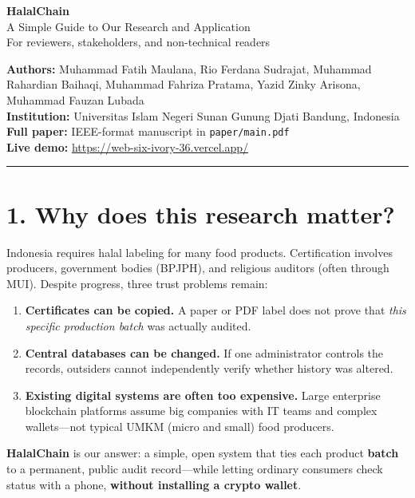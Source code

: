 \documentclass[11pt,a4paper]{article}
\newcommand{\sectionline}{\vspace{0.3em}\noindent\rule{\textwidth}{0.6pt}\vspace{0.6em}}
\begin{document}
\begin{center}
  {\LARGE\bfseries\color{halalgreen} HalalChain}\\[0.4em]
  {\large A Simple Guide to Our Research and Application}\\[0.8em]
  {\normalsize For reviewers, stakeholders, and non-technical readers}\\[1.2em]
\end{center}

\noindent
\textbf{Authors:} Muhammad Fatih Maulana, Rio Ferdana Sudrajat, Muhammad Rahardian Baihaqi, Muhammad Fahriza Pratama, Yazid Zinky Arisona, Muhammad Fauzan Lubada\\
\textbf{Institution:} Universitas Islam Negeri Sunan Gunung Djati Bandung, Indonesia\\
\textbf{Full paper:} IEEE-format manuscript in \texttt{paper/main.pdf}\\
\textbf{Live demo:} \url{https://web-six-ivory-36.vercel.app/}

\sectionline

\section*{1. Why does this research matter?}

Indonesia requires halal labeling for many food products. Certification involves producers, government bodies (BPJPH), and religious auditors (often through MUI). Despite progress, three trust problems remain:

\begin{enumerate}[leftmargin=1.4em, itemsep=0.35em]
  \item \textbf{Certificates can be copied.} A paper or PDF label does not prove that \emph{this specific production batch} was actually audited.
  \item \textbf{Central databases can be changed.} If one administrator controls the records, outsiders cannot independently verify whether history was altered.
  \item \textbf{Existing digital systems are often too expensive.} Large enterprise blockchain platforms assume big companies with IT teams and complex wallets---not typical UMKM (micro and small) food producers.
\end{enumerate}

\noindent
\textbf{HalalChain} is our answer: a simple, open system that ties each product \textbf{batch} to a permanent, public audit record---while letting ordinary consumers check status with a phone, \textbf{without installing a crypto wallet}.
\end{document}
